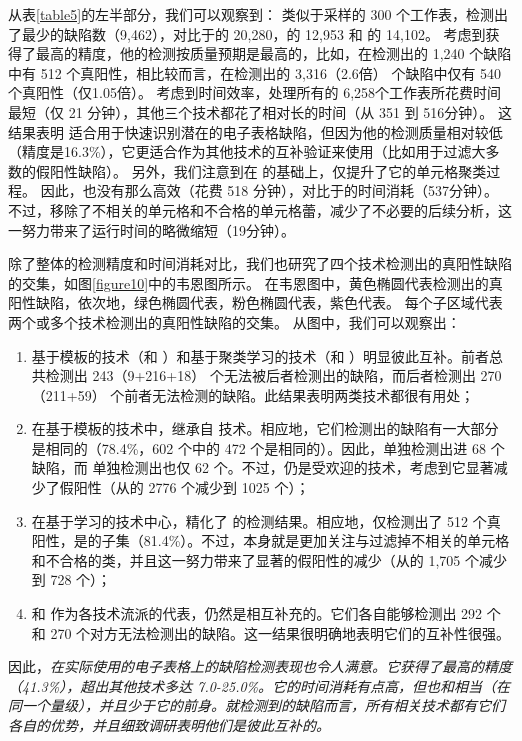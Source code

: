 从表\ref{table5}的左半部分，我们可以观察到：
类似于采样的 300 个工作表，\wa 检测出了最少的缺陷数（9,462），对比于\am 的 20,280，\ca 的 12,953 和 \cu 的 14,102。
考虑到\wa 获得了最高的精度，他的检测按质量预期是最高的，比如，在\wa 检测出的 1,240 个缺陷中有 512 个真阳性，相比较而言，在\am 检测出的 3,316（2.6倍） 个缺陷中仅有 540 个真阳性（仅1.05倍）。
考虑到时间效率，\am 处理所有的 6,258个工作表所花费时间最短（仅 21 分钟），其他三个技术都花了相对长的时间（从 351 到 516分钟）。
这结果表明 \am 适合用于快速识别潜在的电子表格缺陷，但因为他的检测质量相对较低（精度是16.3\%），它更适合作为其他技术的互补验证来使用（比如用于过滤大多数的假阳性缺陷）。
另外，我们注意到\wa 在 \cu 的基础上，仅提升了它的单元格聚类过程。
因此，\wa 也没有那么高效（花费 518 分钟），对比于\cu 的时间消耗（537分钟）。
不过，\wa 移除了不相关的单元格和不合格的单元格蕾，减少了不必要的后续分析，这一努力带来了运行时间的略微缩短（19分钟）。

除了整体的检测精度和时间消耗对比，我们也研究了四个技术检测出的真阳性缺陷的交集，如图\ref{figure10}中的韦恩图所示。
在韦恩图中，黄色椭圆代表\am 检测出的真阳性缺陷，依次地，绿色椭圆代表\ca ，粉色椭圆代表\cu ，紫色代表\wa 。
每个子区域代表两个或多个技术检测出的真阳性缺陷的交集。
从图中，我们可以观察出：
\begin{enumerate}
    \item 基于模板的技术（\am 和 \ca）和基于聚类学习的技术（\cu 和 \wa）明显彼此互补。前者总共检测出 243（9+216+18） 个无法被后者检测出的缺陷，而后者检测出 270（211+59） 个前者无法检测的缺陷。此结果表明两类技术都很有用处；
    \item 在基于模板的技术中，\ca 继承自 \am 技术。相应地，它们检测出的缺陷有一大部分是相同的（78.4\%，602 个中的 472 个是相同的）。因此，\am 单独检测出进 68 个缺陷，而 \ca 单独检测出也仅 62 个。不过，\ca 仍是受欢迎的技术，考虑到它显著减少了假阳性（从\am 的 2776 个减少到 1025 个）；
    \item 在基于学习的技术中心，\wa 精化了 \cu 的检测结果。相应地，\wa 仅检测出了 512 个真阳性，是\cu 的子集（81.4\%）。不过，\wa 本身就是更加关注与过滤掉不相关的单元格和不合格的类，并且这一努力带来了显著的假阳性的减少（从\cu 的 1,705 个减少到 728 个）；
    \item \ca 和 \wa 作为各技术流派的代表，仍然是相互补充的。它们各自能够检测出 292 个和 270 个对方无法检测出的缺陷。这一结果很明确地表明它们的互补性很强。
\end{enumerate}

因此，\textit{\wa 在实际使用的电子表格上的缺陷检测表现也令人满意。它获得了最高的精度（41.3\%），超出其他技术多达 7.0-25.0\%。它的时间消耗有点高，但也和\ca 相当（在同一个量级），并且少于它的前身\cu。就检测到的缺陷而言，所有相关技术都有它们各自的优势，并且细致调研表明他们是彼此互补的。}
